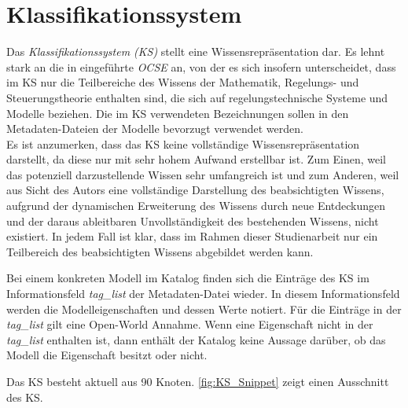 \section{Klassifikationssystem}
\label{Ch:Ergebnisse:Sec:KS}
Das \textit{Klassifikationssystem (KS)} stellt eine Wissensrepräsentation dar. Es lehnt stark an die in \cite{KNHE20a} eingeführte \textit{OCSE} an, von der es sich insofern unterscheidet, dass im KS nur die Teilbereiche des Wissens der Mathematik, Regelungs- und Steuerungstheorie enthalten sind, die sich auf regelungstechnische Systeme und Modelle beziehen. Die im KS verwendeten Bezeichnungen sollen in den Metadaten-Dateien der Modelle bevorzugt verwendet werden. \\
Es ist anzumerken, dass das KS keine vollständige Wissensrepräsentation darstellt, da diese nur mit sehr hohem Aufwand erstellbar ist. Zum Einen, weil das potenziell darzustellende Wissen sehr umfangreich ist und zum Anderen, weil aus Sicht des Autors eine vollständige Darstellung des beabsichtigten Wissens, aufgrund der dynamischen Erweiterung des Wissens durch neue Entdeckungen und der daraus ableitbaren Unvollständigkeit des bestehenden Wissens, nicht existiert. In jedem Fall ist klar, dass im Rahmen dieser Studienarbeit nur ein Teilbereich des beabsichtigten Wissens abgebildet werden kann. 

Bei einem konkreten Modell im Katalog finden sich die Einträge des KS im Informationsfeld \textit{tag\_list} der Metadaten-Datei wieder. In diesem Informationsfeld werden die Modelleigenschaften und dessen Werte notiert. Für die Einträge in der \textit{tag\_list} gilt eine Open-World Annahme. Wenn eine Eigenschaft nicht in der \textit{tag\_list} enthalten ist, dann enthält der Katalog keine Aussage darüber, ob das Modell die Eigenschaft besitzt oder nicht.

Das KS besteht aktuell aus 90 Knoten. \autoref{fig:KS_Snippet} zeigt einen Ausschnitt des KS.

